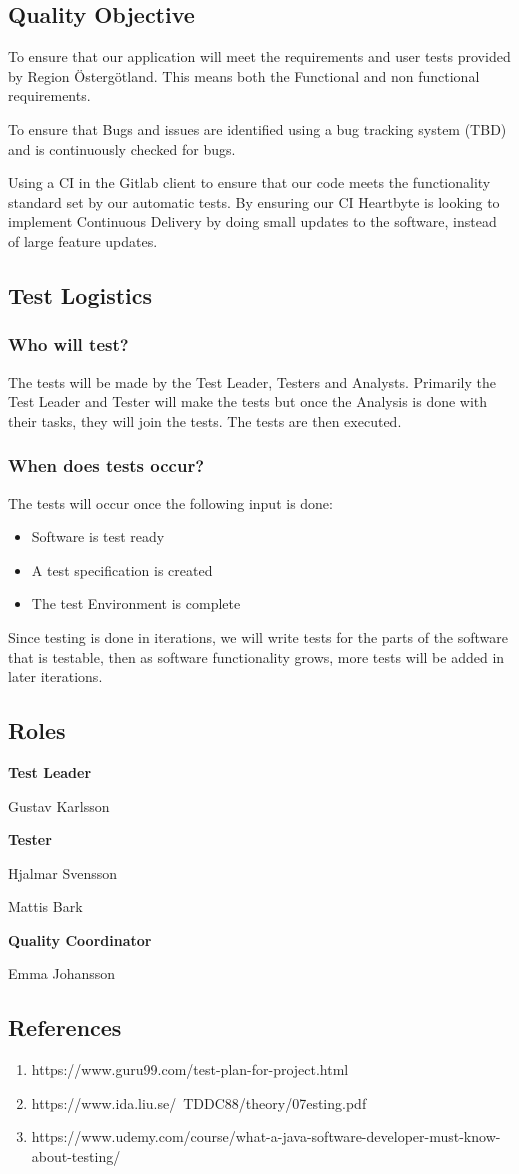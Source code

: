 \subsection{Quality Objective}
To ensure that our application will meet the requirements and user tests provided by Region Östergötland. This means both the Functional and non functional requirements. 

To ensure that Bugs and issues are identified using a bug tracking system (TBD) and is continuously checked for bugs.

Using a CI in the Gitlab client to ensure that our code meets the functionality standard set by our automatic tests. By ensuring our CI Heartbyte is looking to implement Continuous Delivery by doing small updates to the software, instead of large feature updates. 
\subsection{Test Logistics}
\subsubsection{Who will test?}
The tests will be made by the Test Leader, Testers and Analysts. Primarily the Test Leader and Tester will make the tests but once the Analysis is done with their tasks, they will join the tests. The tests are then executed.
\subsubsection{When does tests occur?}
The tests will occur once the following input is done:
\begin{itemize}
    \item Software is test ready
    \item A test specification is created
    \item The test Environment is complete
\end{itemize}
Since testing is done in iterations, we will write tests for the parts of the software that is testable, then as software functionality grows, more tests will be added in later iterations. 
\subsection{Roles}
\begin{flushleft}
   \textbf{Test Leader}
    
    
    Gustav Karlsson
  
   \textbf{Tester}
   
    Hjalmar Svensson
    
    Mattis Bark
   
   
   \textbf{Quality Coordinator}
   
    Emma Johansson
     

\end{flushleft}

\subsection{References}
\begin{enumerate}
  \item https://www.guru99.com/test-plan-for-project.html
  \item https://www.ida.liu.se/~TDDC88/theory/07esting.pdf
  \item https://www.udemy.com/course/what-a-java-software-developer-must-know-about-testing/
\end{enumerate}
